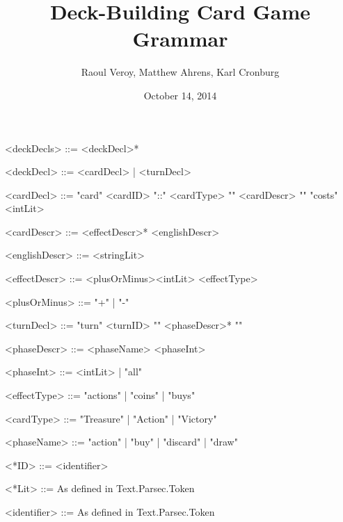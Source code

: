 \documentclass{article}
\title{Deck-Building Card Game Grammar}
\author{Raoul Veroy, Matthew Ahrens, Karl Cronburg}
\date{October 14, 2014}
\begin{document}
\maketitle
\thispagestyle{empty}

\begin{grammar}


<deckDecls>  ::= <deckDecl>*

<deckDecl>   ::= <cardDecl> | <turnDecl>


<cardDecl>    ::= "card" <cardID> "::" <cardType> "{" <cardDescr> "}" "costs" <intLit>

<cardDescr>   ::= <effectDescr>* <englishDescr>

<englishDescr> ::= <stringLit>

<effectDescr>  ::= <plusOrMinus><intLit> <effectType>

<plusOrMinus> ::= "+" | "-"


<turnDecl>   ::= "turn" <turnID> "{" <phaseDescr>* "}"

<phaseDescr> ::= <phaseName> <phaseInt>

<phaseInt>   ::= <intLit> | "all"


<effectType>  ::= "actions"   | "coins"  | "buys"

<cardType>    ::= "Treasure" | "Action" | "Victory"

<phaseName>   ::= "action"   | "buy"    | "discard" | "draw"

<*ID>         ::= <identifier>

<*Lit>      ::= As defined in Text.Parsec.Token

<identifier>  ::= As defined in Text.Parsec.Token

%
%
%
%
\end{grammar}
\end{document}

